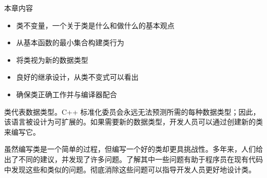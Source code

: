 本章内容

\begin{itemize}
\item
类不变量，一个关于类是什么和做什么的基本观点

\item
从基本函数的最小集合构建类行为

\item
将类视为新的数据类型

\item
良好的继承设计，从类不变式可以看出

\item
确保类正确工作并与编译器配合
\end{itemize}

类代表数据类型。C++ 标准化委员会永远无法预测所需的每种数据类型；因此，该语言被设计为可扩展的。如果需要新的数据类型，开发人员可以通过创建新的类来编写它。

虽然编写类是一个简单的过程，但编写一个好的类却更具挑战性。多年来，人们给出了不同的建议，并发现了许多问题。了解其中一些问题有助于程序员在现有代码中发现这些和类似的问题。彻底消除这些问题可以指导开发人员更好地设计类。
